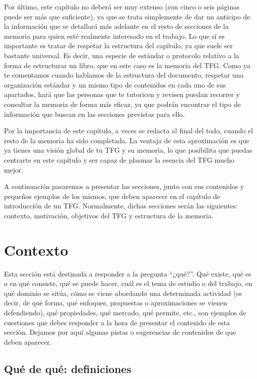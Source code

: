 Por último, este capítulo no deberá ser muy extenso (con cinco o seis páginas puede ser más que suficiente), ya que se trata simplemente de dar un anticipo de la información que se detallará más adelante en el resto de secciones de la memoria para quien esté realmente interesado en el trabajo. Lo que sí es importante es tratar de respetar la estructura del capítulo, ya que suele ser bastante universal. Es decir, una especie de estándar o protocolo relativo a la forma de estructurar un libro, que en este caso es la memoria del TFG. Como ya te comentamos cuando hablamos de la estructura del documento, respetar una organización estándar y un mismo tipo de contenidos en cada uno de sus apartados, hará que las personas que te tutoricen y revisen puedan recorrer y consultar la memoria de forma más eficaz, ya que podrán encontrar el tipo de información que buscan en las secciones previstas para ello.

Por la importancia de este capítulo, a veces se redacta al final del todo, cuando el resto de la memoria ha sido completada. La ventaja de esta aproximación es que ya tienes una visión global de tu TFG y su memoria, lo que posibilita que puedas centrarte en este capítulo y ser capaz de plasmar la esencia del TFG mucho mejor.

A continuación pasaremos a presentar las secciones, junto con sus contenidos y pequeños ejemplos de los mismos, que deben aparecer en el capítulo de introducción de un TFG. Normalmente, dichas secciones serán las siguientes: contexto, motivación, objetivos del TFG y estructura de la memoria.

\section{Contexto}\label{Contexto}
Esta sección está destinada a responder a la pregunta ``¿qué?''. Qué existe, qué es o en qué consiste, qué se puede hacer, cuál es el tema de estudio o del trabajo, en qué dominio se sitúa, cómo se viene abordando una determinada actividad (es decir, de qué forma, qué enfoques, propuestas o aproximaciones se vienen defendiendo), qué propiedades, qué mercado, qué permite, etc., son ejemplos de cuestiones que debes responder a la hora de presentar el contenido de esta sección. Dejamos por aquí algunas pistas o sugerencias de contenidos de que deben aparecer.

\subsection{Qué de qué: definiciones}

